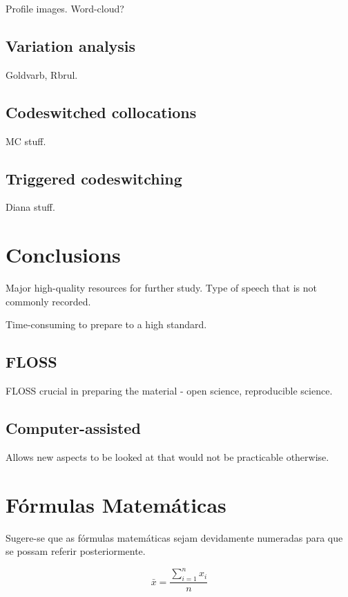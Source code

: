 \documentclass[a4paper, twocolumn, 11pt, twoside]{article}
\begin{document}
Profile images.  Word-cloud?

\subsection{Variation analysis}

Goldvarb, Rbrul.

\subsection{Codeswitched collocations}

MC stuff.

\subsection{Triggered codeswitching}

Diana stuff.


\section{Conclusions}

Major high-quality resources for further study.  Type of speech that is not commonly recorded.

Time-consuming to prepare to a high standard.

\subsection{FLOSS}

FLOSS crucial in preparing the material - open science, reproducible science.

\subsection{Computer-assisted}

Allows new aspects to be looked at that would not be practicable otherwise.


\section{Fórmulas Matemáticas}

Sugere-se que as fórmulas matemáticas sejam devidamente numeradas para
que se possam referir posteriormente.

\begin{equation}
  \label{media}
  \bar{x} = \frac{\sum_{i=1}^n x_i}{n}
\end{equation}
\end{document}
